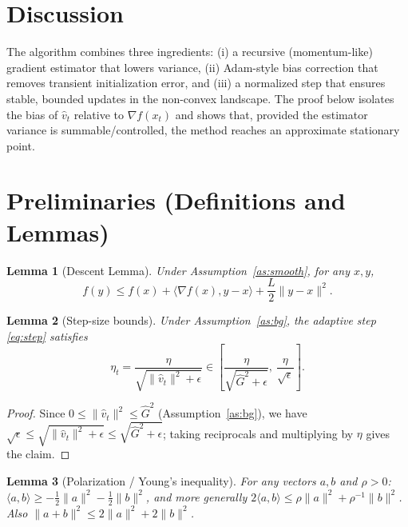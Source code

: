 \documentclass[11pt]{article}
\newtheorem{lemma}{Lemma}
\begin{document}
\section*{Discussion}
The algorithm combines three ingredients: (i) a recursive (momentum-like) gradient estimator
that lowers variance, (ii) Adam-style bias correction that removes transient initialization
error, and (iii) a normalized step that ensures stable, bounded updates in the non-convex
landscape. The proof below isolates the bias of $\hat v_t$ relative to $\nabla f(x_t)$ and
shows that, provided the estimator variance is summable/controlled, the method reaches an
approximate stationary point.

\section*{Preliminaries (Definitions and Lemmas)}

\begin{lemma}[Descent Lemma]\label{lem:descent}
Under Assumption~\ref{as:smooth}, for any $x,y$,
\[
f(y) \le f(x) + \langle \nabla f(x), y-x\rangle + \frac{L}{2}\|y-x\|^2.
\]
\end{lemma}

\begin{lemma}[Step-size bounds]\label{lem:step}
Under Assumption~\ref{as:bg}, the adaptive step \eqref{eq:step} satisfies
\[
\eta_t = \frac{\eta}{\sqrt{\|\hat v_t\|^2+\epsilon}}
\in \left[\frac{\eta}{\sqrt{\hat G^2+\epsilon}},\ \frac{\eta}{\sqrt{\epsilon}}\right].
\]
\end{lemma}
\begin{proof}
Since $0 \le \|\hat v_t\|^2 \le \hat G^2$ (Assumption~\ref{as:bg}), we have
$\sqrt{\epsilon} \le \sqrt{\|\hat v_t\|^2+\epsilon} \le \sqrt{\hat G^2+\epsilon}$;
taking reciprocals and multiplying by $\eta$ gives the claim.
\end{proof}

\begin{lemma}[Polarization / Young's inequality]\label{lem:young}
For any vectors $a,b$ and $\rho>0$:
$\langle a,b\rangle \ge -\tfrac{1}{2}\|a\|^2 - \tfrac{1}{2}\|b\|^2$, and more generally
$2\langle a,b\rangle \le \rho\|a\|^2 + \rho^{-1}\|b\|^2$. Also
$\|a+b\|^2 \le 2\|a\|^2 + 2\|b\|^2$.
\end{lemma}
\end{document}
